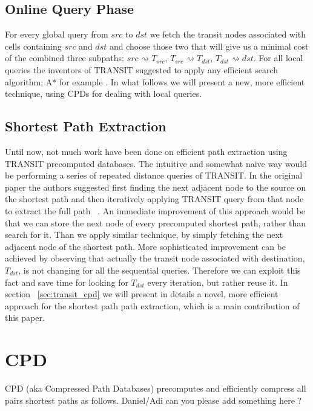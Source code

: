 \documentclass[runningheads,a4paper]{llncs}
\begin{document}
\subsection{Online Query Phase}\label{sub:query}
For every global query from $src$ to $dst$ we fetch the transit nodes associated with cells containing
$src$ and $dst$ and choose those two that will give us a minimal cost of the combined three subpaths:
$src \rightsquigarrow T_{src}$, $T_{src} \rightsquigarrow T_{dst}$, $T_{dst} \rightsquigarrow dst$.
For all local queries the inventors of TRANSIT suggested to apply any efficient search algorithm; A* for example \cite{bast06}.
In what follows we will present a new, more efficient technique, using CPDs for dealing with local queries.

\subsection{Shortest Path Extraction}\label{sub:path_extraction}
Until now, not much work have been done on efficient path extraction using TRANSIT precomputed databases.
The intuitive and somewhat naive way would be performing a series of repeated distance queries of TRANSIT.
In the original paper the authors suggested first finding the next adjacent node to the source on the shortest path
and then iteratively applying TRANSIT query from that node to extract the full path ~\cite{bast06}.
An immediate improvement of this approach would be that we can store the next node of every precomputed
shortest path, rather than search for it.  Than we apply similar technique, by simply fetching the next adjacent node of the shortest path.
More sophisticated improvement can be achieved by observing that actually the transit node associated with destination, $T_{dst}$,
is not changing for all the sequential queries. Therefore we can exploit this fact and save time for looking for $T_{dst}$ every iteration, but 
rather reuse it.
In section ~\ref{sec:transit_cpd} we will present in details a novel, more efficient approach for the shortest path path extraction,
which is a main contribution of this paper.

\section{CPD}
CPD (aka Compressed Path Databases) precomputes and efficiently compress all pairs shortest paths as follows.
Daniel/Adi can you please add something here ?
\end{document}
